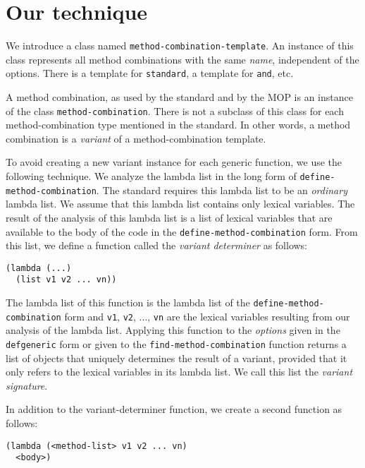 \section{Our technique}

We introduce a class named \texttt{method-combination-template}.  An
instance of this class represents all method combinations with the
same \emph{name}, independent of the options.  There is a template for
\texttt{standard}, a template for \texttt{and}, etc.

A method combination, as used by the \commonlisp{} standard and by the
MOP is an instance of the class \texttt{method-combination}.  There is
not a subclass of this class for each method-combination type
mentioned in the \commonlisp{} standard.  In other words, a method
combination is a \emph{variant} of a method-combination template.

To avoid creating a new variant instance for each generic function, we
use the following technique.  We analyze the lambda list in the long
form of \texttt{define-method-combination}.  The \commonlisp{}
standard requires this lambda list to be an \emph{ordinary} lambda
list.  We assume that this lambda list contains only lexical
variables.  The result of the analysis of this lambda list is a list
of lexical variables that are available to the body of the code in the
\texttt{define-method-combination} form.  From this list, we define a
function called the \emph{variant determiner} as follows:

\begin{verbatim}
(lambda (...)
  (list v1 v2 ... vn))
\end{verbatim}

The lambda list of this function is the lambda list of the
\texttt{define-method-combination} form and \texttt{v1}, \texttt{v2},
..., \texttt{vn} are the lexical variables resulting from our analysis
of the lambda list.  Applying this function to the \emph{options}
given in the \texttt{defgeneric} form or given to the
\texttt{find-method-combination} function returns a list of objects
that uniquely determines the result of a variant, provided that it
only refers to the lexical variables in its lambda list.  We call this
list the \emph{variant signature}.

In addition to the variant-determiner function, we create a second
function as follows:

\begin{verbatim}
(lambda (<method-list> v1 v2 ... vn)
  <body>)
\end{verbatim}

